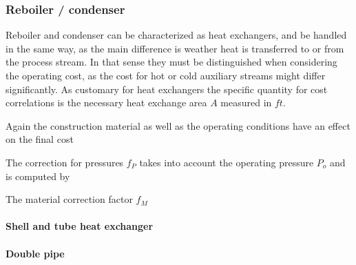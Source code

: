 	\subsubsection{Reboiler / condenser}
		Reboiler and condenser can be characterized as heat exchangers, and be handled in the same way,
		as the main difference is weather heat is transferred to or from the process stream. In that sense
		they must be distinguished when considering the operating cost, as the cost for hot or cold
		auxiliary streams might differ significantly. As customary for heat exchangers the specific
		quantity for cost correlations is the necessary heat exchange area $A$ measured in $ft$.
		
		Again the construction material as well as the operating conditions have an effect on the
		final cost
		
		The correction for pressures $f_P$ takes into account the operating pressure $P_o$ and
		is computed by
		
		The material correction factor $f_M$
		
		\paragraph{Shell and tube heat exchanger}
		
		\paragraph{Double pipe}

